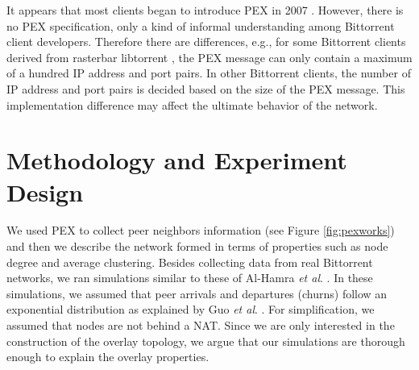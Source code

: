 \documentclass[10pt,conference,letterpaper,final]{IEEEtran}
\begin{document}
It appears that most clients began to introduce PEX in 2007  \cite{client}. 
However, there is no PEX specification, only a kind of informal understanding among Bittorrent client developers.
Therefore there are differences, e.g., for some Bittorrent clients derived from rasterbar libtorrent \cite{rasterbar}, the PEX message can only contain a maximum of a hundred IP address and port pairs. 
In other Bittorrent clients, the number of IP address and port pairs is decided based on the size of the PEX message.  
This implementation difference may affect the ultimate behavior of the network.

\section{Methodology and Experiment Design}\label{methodanddesign}

We used PEX to collect peer neighbors information  (see Figure \ref{fig:pexworks}) and then we describe the network formed in terms of properties such as node degree and average clustering. 
Besides collecting data from real Bittorrent networks, we ran simulations similar to these of Al-Hamra \textit{et al}. \cite{al2009swarming}. 
In these simulations, we assumed that peer arrivals and departures (churns) follow an exponential distribution as explained by Guo \textit{et al}. \cite{guo2005measurements}. 
For simplification, we assumed that nodes are not behind a NAT.
Since we are only interested in the construction of the overlay topology, we argue that our simulations are thorough enough to explain the overlay properties.
\end{document}
